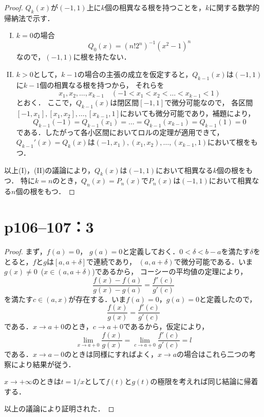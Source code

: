 \documentclass[a4paper,10pt,fleqn]{ltjsarticle}
\begin{document}
\begin{leftbar}
    \begin{proof}
        $Q_k (x)$が$(-1,1)$上に$k$個の相異なる根を持つことを，$k$に関する数学的帰納法で示す．
        \begin{enumerate}[(I)]
            \item $k=0$の場合
                  \[
                      Q_0(x)= (n! 2^n)^{-1} (x^2-1)^n
                  \]
                  なので，$(-1,1)$に根を持たない．
            \item $k>0$として，$k-1$の場合の主張の成立を仮定すると，$Q_{k-1}(x)$は$(-1,1)$に$k-1$個の相異なる根を持つから，
                  それらを
                  \[
                      x_1,x_2,\dots,x_{k-1}\quad (-1<x_1<x_2<\dots <x_{k-1}<1)
                  \]とおく．
                  ここで，$Q_{k-1} (x)$は閉区間$[-1,1]$で微分可能なので，
                  各区間$[-1,x_1],[x_1,x_2],\dots,[x_{k-1},1]$においても微分可能であり，補題により，
                  \[
                      Q_{k-1} (-1) = Q_{k-1}(x_1)=\dots = Q_{k-1}(x_{k-1})=Q_{k-1}(1)=0
                  \]
                  である．したがって各小区間においてロルの定理が適用できて，$Q_{k-1}' (x)=Q_k(x)$は$(-1,x_1),(x_1,x_2),\dots,(x_{k-1},1)$において根をもつ．
        \end{enumerate}
        以上(I)，(II)の議論により，$Q_k (x)$は$(-1,1)$において相異なる$k$個の根をもつ．
        特に$k=n$のとき，$Q_n (x)=P_n(x)$で$P_n (x)$は$(-1,1)$において相異なる$n$個の根をもつ．
    \end{proof}
\end{leftbar}

\newpage

\section*{p106--107：3}

\begin{tleftbar}
    \begin{proof}
        まず，$f(a)=0$， $g(a)=0$と定義しておく．$0<\delta <b-a$を満たす$\delta$をとると，$f$と$g$は$[a,a+\delta]$で連続であり，
        $(a,a+\delta)$で微分可能である．いま$g(x) \ne 0$~($ x \in (a,a+\delta)$)であるから，
        コーシーの平均値の定理により，
        \[
            \frac{f(x)-f(a)}{g(x)-g(a)} = \frac{f'(c)}{g'(c)}
        \]
        を満たす$c \in (a,x)$が存在する．いま$f(a)=0$，$g(a)=0$と定義したので，
        \[
            \frac{f(x)}{g(x)} = \frac{f'(c)}{g'(c)}
        \]
        である．$ x \to a+0$のとき，$c \to a+0$であるから，仮定により，
        \[
            \lim_{x \to a+0} \frac{f(x)}{g(x)} = \lim_{c \to a+0} \frac{f'(c)}{g'(c)} =l
        \]
        である．$ x \to a-0$のときは同様にすればよく，$ x \to a$の場合はこれら二つの考察により結果が従う．

        $ x \to +\infty$のときは$ t=1/x$として$f(t)$と$g(t)$の極限を考えれば同じ結論に帰着する．

        以上の議論により証明された．
    \end{proof}
\end{tleftbar}
\end{document}
